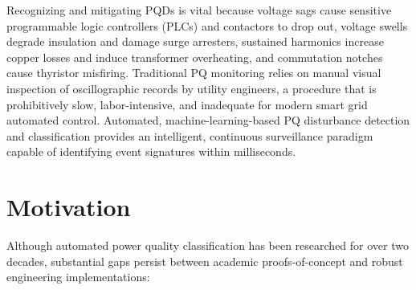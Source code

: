 \documentclass[12pt,a4paper]{report}
\begin{document}
Recognizing and mitigating PQDs is vital because voltage sags cause sensitive programmable logic controllers (PLCs) and contactors to drop out, voltage swells degrade insulation and damage surge arresters, sustained harmonics increase copper losses and induce transformer overheating, and commutation notches cause thyristor misfiring. Traditional PQ monitoring relies on manual visual inspection of oscillographic records by utility engineers, a procedure that is prohibitively slow, labor-intensive, and inadequate for modern smart grid automated control. Automated, machine-learning-based PQ disturbance detection and classification provides an intelligent, continuous surveillance paradigm capable of identifying event signatures within milliseconds.

\section{Motivation}
Although automated power quality classification has been researched for over two decades, substantial gaps persist between academic proofs-of-concept and robust engineering implementations:
\end{document}
